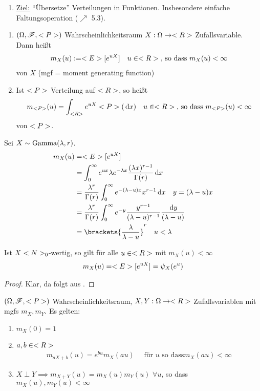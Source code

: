 \begin{enumerate}[label=]
	\item \ul{Ziel:} ``Übersetze'' Verteilungen in Funktionen. Insbesondere einfache Faltungsoperation ($\nearrow$ 5.3). %
\end{enumerate}
\begin{definition}
	\begin{enumerate}
		\item $(\O,\F,\P)$ Wahrscheinlichkeitsraum $X: \O \to \R$ Zufallsvariable. Dann heißt
		\begin{align*}
			m_X(u) := \E[e^{uX}] \quad u\in \R\text{, so dass } m_X(u) < \infty
		\end{align*}
		 von $X$ (mgf = moment generating function)
		\item Ist $\P$ Verteilung auf $\R$, so heißt
		\begin{align*}
			m_{\P}(u) = \int_{\R}e^{uX} \P(\d x) \quad u \in \R\text{, so dass } m_{\P}(u) < \infty
		\end{align*}
		 von $\P$.
	\end{enumerate}
\end{definition}
\begin{example}
	Sei $X \sim \Gam(\lambda,r)$.
	\begin{align*}
		m_X(u) &= \E[e^{uX}]\\
		&= \int_{0}^{\infty} e^{ux}\lambda e^{-\lambda x}\frac{(\lambda x)^{r-1}}{\Gamma(r)}\d x\\
		&= \frac{\lambda^r}{\Gamma(r)} \int_{0}^{\infty}e^{-(\lambda-u)x}x^{r-1}\d x \quad y= (\lambda-u)x\\
		&= \frac{\lambda^r}{\Gamma(r)}\int_0^{\infty} e^{-y}\frac{y^{r-1}}{(\lambda-u)^{r-1}}\frac{\d y}{(\lambda-u)}\\
		&= \brackets{\frac{\lambda}{\lambda-u}}^r \quad u < \lambda
	\end{align*}
\end{example}
\begin{lemma}
	Ist $X$ $\N_0$-wertig, so gilt für alle $u \in \R$ mit $m_X(u) < \infty$
	\begin{align*}
		m_X(u) = \E[e^{uX}] = \psi_X(e^u)
	\end{align*}
\end{lemma}
\begin{proof}
	Klar, da folgt aus .
\end{proof}
\begin{proposition}
	$(\O,\F,\P)$ Wahrscheinlichkeitsraum, $X,Y: \O \to \R$ Zufallsvariablen mit mgfs $m_X,m_Y$. Es gelten:
	\begin{enumerate}
		\item $m_X(0) = 1$
		\item $a,b \in \R$
		\begin{align*}
			m_{aX+b}(u) = e^{bu}m_X(au) \quad \text{ für } u \text{ so dass} m_X(au) < \infty
		\end{align*}
		\item $X \perp Y \implies m_{X+Y}(u) = m_X(u)m_Y(u)$ $\forall u$, so dass $m_X(u), m_Y(u) < \infty$ 
	\end{enumerate}
\end{proposition}
